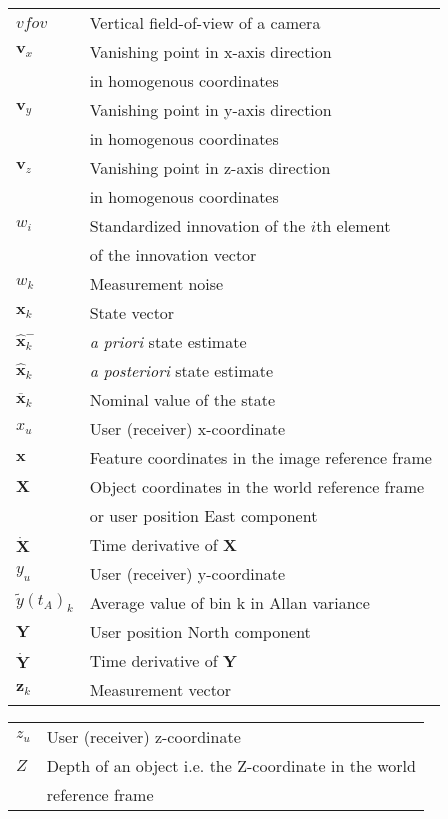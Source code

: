 \begin{tabular}{l@{\hspace{3cm}}l}
$vfov$ & Vertical field-of-view of a camera\\[2.0ex]
$\mathbf v_x$ & Vanishing point in x-axis direction\\[0.5ex]
{} & in homogenous coordinates\\[2.0ex]
$\mathbf v_y$ & Vanishing point in y-axis direction\\[0.5ex]
{} & in homogenous coordinates\\[2.0ex]
$\mathbf v_z$ & Vanishing point in z-axis direction\\[0.5ex]
{} & in homogenous coordinates\\[2.0ex]
$w_i$ & Standardized innovation of the $i$th element\\[0.5ex]
{} & of the innovation vector\\[2.0ex]
$w_k$ & Measurement noise\\[2.0ex]
$\mathbf x_k$ & State vector\\[2.0ex]
$\mathbf{\hat x}_k^-$ & \textit{a priori} state estimate\\[2.0ex]
$\mathbf{\hat x}_k$ & \textit{a posteriori} state estimate\\[2.0ex]
$\mathbf{\overline x}_k$ & Nominal value of the state\\[2.0ex]
$x_u$ & User (receiver) x-coordinate\\[2.0ex]
$\mathbf x$ & Feature coordinates in the image reference frame\\[2.0ex]
$\mathbf X$ & Object coordinates in the world reference frame\\[0.5ex]
{} & or user position East component\\[2.0ex]
$\mathbf{\dot{X}}$ & Time derivative of $\mathbf X$\\[2.0ex]
$y_u$ & User (receiver) y-coordinate\\[2.0ex]
$\tilde y(t_A)_k$ & Average value of bin k in Allan variance\\[2.0ex]
$\mathbf Y$ & User position North component\\[2.0ex]
$\mathbf{\dot{Y}}$ & Time derivative of $\mathbf Y$\\[2.0ex]
$\mathbf z_k$ & Measurement vector\\[2.0ex]
\end{tabular}
\newpage
\begin{tabular}{l@{\hspace{3cm}}l}
$z_u$ & User (receiver) z-coordinate\\[2.0ex]
$Z$ & Depth of an object i.e. the Z-coordinate in the world\\[0.5ex]
{} &  reference frame\\[2.0ex]

\end{tabular}

